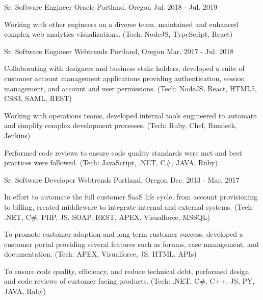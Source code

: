 \begin{cventries}
  \cventry
    {Sr. Software Engineer} %
    {Oracle} %
    {Portland, Oregon} %
    {Jul. 2018 - Jul. 2019} %
    {
      \begin{cvitems} %
        \item {Working with other engineers on a diverse team, maintained and enhanced complex web analytics visualizations. (Tech: NodeJS, TypeScript, React)}
      \end{cvitems}
    }

  \cventry
    {Sr. Software Engineer} %
    {Webtrends} %
    {Portland, Oregon} %
    {Mar. 2017 - Jul. 2018} %
    {
      \begin{cvitems} %
        \item {Collaborating with designers and business stake holders, developed a suite of customer account management applications providing authentication, session management, and account and user permissions. (Tech: NodeJS, React, HTML5, CSS3, SAML, REST)}
        \item {Working with operations teams, developed internal tools engineered to automate and simplify complex development processes. (Tech: Ruby, Chef, Rundeck, Jenkins)}
        \item {Performed code reviews to ensure code quality standards were met and best practices were followed. (Tech: JavaScript, .NET, C\#, JAVA, Ruby)}
      \end{cvitems}
    }

  \cventry
    {Sr. Software Developer} %
    {Webtrends} %
    {Portland, Oregon} %
    {Dec. 2013 - Mar. 2017} %
    {
      \begin{cvitems} %
        \item {In effort to automate the full customer SaaS life cycle, from account provisioning to billing, created middleware to integrate internal and external systems. (Tech: .NET, C\#, PHP, JS, SOAP, REST, APEX, Visualforce, MSSQL)}
        \item {To promote customer adoption and long-term customer success, developed a customer portal providing several features such as forums, case management, and documentation. (Tech: APEX, Visualforce, JS, HTML, APIs)}
        \item {To ensure code quality, efficiency, and reduce technical debt, performed design and code reviews of customer facing products. (Tech: .NET, C\#, C++, JS, PY, JAVA, Ruby)}
      \end{cvitems}
    }


\end{cventries}
